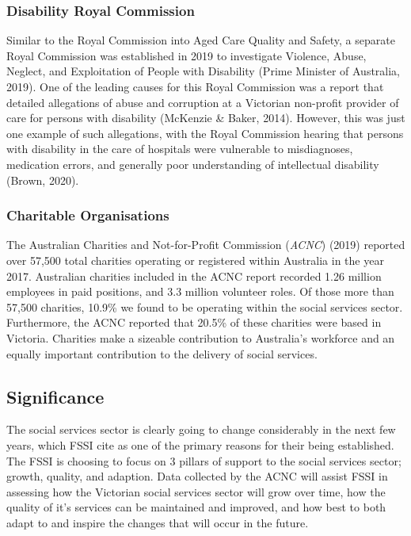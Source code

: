 \documentclass[
  11pt,
]{article}
\begin{document}
\hypertarget{disability-royal-commission}{%
\subsubsection{Disability Royal Commission}\label{disability-royal-commission}}

Similar to the Royal Commission into Aged Care Quality and Safety, a separate Royal Commission was established in 2019 to investigate Violence, Abuse, Neglect, and Exploitation of People with Disability (Prime Minister of Australia, 2019). One of the leading causes for this Royal Commission was a report that detailed allegations of abuse and corruption at a Victorian non-profit provider of care for persons with disability (McKenzie \& Baker, 2014). However, this was just one example of such allegations, with the Royal Commission hearing that persons with disability in the care of hospitals were vulnerable to misdiagnoses, medication errors, and generally poor understanding of intellectual disability (Brown, 2020).

\hypertarget{charitable-organisations}{%
\subsubsection{Charitable Organisations}\label{charitable-organisations}}

The Australian Charities and Not-for-Profit Commission (\emph{ACNC}) (2019) reported over 57,500 total charities operating or registered within Australia in the year 2017. Australian charities included in the ACNC report recorded 1.26 million employees in paid positions, and 3.3 million volunteer roles. Of those more than 57,500 charities, 10.9\% we found to be operating within the social services sector. Furthermore, the ACNC reported that 20.5\% of these charities were based in Victoria. Charities make a sizeable contribution to Australia's workforce and an equally important contribution to the delivery of social services.

\newpage

\hypertarget{significance}{%
\subsection{Significance}\label{significance}}

The social services sector is clearly going to change considerably in the next few years, which FSSI cite as one of the primary reasons for their being established. The FSSI is choosing to focus on 3 pillars of support to the social services sector; growth, quality, and adaption. Data collected by the ACNC will assist FSSI in assessing how the Victorian social services sector will grow over time, how the quality of it's services can be maintained and improved, and how best to both adapt to and inspire the changes that will occur in the future.
\end{document}
